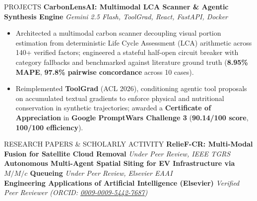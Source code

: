 \documentclass[letterpaper]{resume}
\begin{document}
\begin{rSection}{PROJECTS}
\textbf{CarbonLensAI: Multimodal LCA Scanner \& Agentic Synthesis Engine} \hfill
{\it Gemini 2.5 Flash, ToolGrad, React, FastAPI, Docker}
\begin{itemize}
  \item Architected a multimodal carbon scanner decoupling visual portion estimation from deterministic Life Cycle Assessment (LCA) arithmetic across 140+ verified factors; engineered a stateful half-open circuit breaker with category fallbacks and benchmarked against literature ground truth (\textbf{8.95\% MAPE}, \textbf{97.8\% pairwise concordance} across 10 cases).
  \item Reimplemented \textbf{ToolGrad} (ACL 2026), conditioning agentic tool proposals on accumulated textual gradients to enforce physical and nutritional conservation in synthetic trajectories; awarded a \textbf{Certificate of Appreciation} in \textbf{Google PromptWars Challenge 3} (\textbf{90.14/100 score}, \textbf{100/100 efficiency}).
\end{itemize}

\end{rSection}


\begin{rSection}{RESEARCH PAPERS \& SCHOLARLY ACTIVITY}
\textbf{RelieF-CR: Multi-Modal Fusion for Satellite Cloud Removal} \hfill \textit{Under Peer Review, IEEE TGRS} \\
\textbf{Autonomous Multi-Agent Spatial Siting for EV Infrastructure via $M/M/c$ Queueing} \hfill \textit{Under Peer Review, Elsevier EAAI} \\
\textbf{Engineering Applications of Artificial Intelligence (Elsevier)} \hfill \textit{Verified Peer Reviewer (ORCID: \href{https://orcid.org/0009-0009-5442-7687}{0009-0009-5442-7687})}
\end{rSection}

\end{document}
